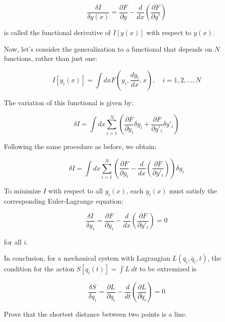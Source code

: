 \begin{equation}
    \frac{\delta I}{\delta y(x)} = \frac{\partial F}{\partial y} - \frac{d}{dx} \left(\frac{\partial F}{\partial y'}\right)
\end{equation}

is called the functional derivative of $I[y(x)]$ with respect to $y(x)$.

Now, let's consider the generalization to a functional that depends on $N$ functions, 
rather than just one:

\begin{equation}
    I[y_i(x)] = \int dx F(y_i, \frac{dy_i}{dx}, x), \quad i = 1, 2, \dots, N
\end{equation}

The variation of this functional is given by:

\begin{equation}
    \delta I = \int dx \sum_{i=1}^{N} \left( \frac{\partial F}{\partial y_i} \delta y_i + \frac{\partial F}{\partial y'_i} \delta y'_i \right)
\end{equation}

Following the same procedure as before, we obtain:

\begin{equation}
    \delta I = \int dx \sum_{i=1}^{N} \left( \frac{\partial F}{\partial y_i} - \frac{d}{dx} \left(\frac{\partial F}{\partial y'_i}\right) \right) \delta y_i
\end{equation}

To minimize $I$ with respect to all $y_i(x)$, each $y_i(x)$ must satisfy the 
corresponding Euler-Lagrange equation:

\begin{equation}
    \frac{\delta I}{\delta y_i} = \frac{\partial F}{\partial y_i} - \frac{d}{dx} \left(\frac{\partial F}{\partial y'_i}\right) = 0
\end{equation}

for all $i$.

In conclusion, for a mechanical system with Lagrangian $L\left(q_i, \dot{q_i}, t\right)$,
the condition for the action $S[q_i(t)] = \int L\ dt$ to be extremized is

\begin{equation}
    \frac{\delta S}{\delta q_i} = \frac{\partial L}{\partial q_i} - \frac{d}{dt} \left(\frac{\partial L}{\partial \dot{q}_i}\right) = 0
\end{equation}

\begin{example}
    Prove that the shortest distance between two points is a line.
\end{example}

